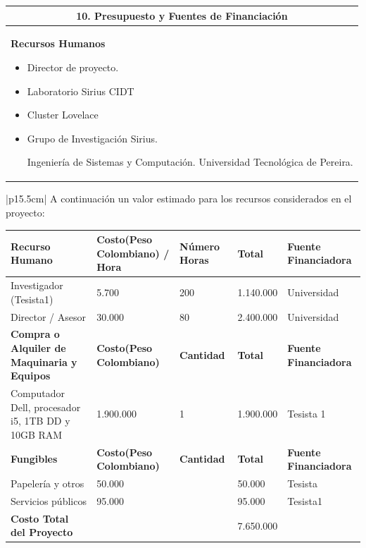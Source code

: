 \documentclass[letter,12pt]{article}
\begin{document}
\begin{center}
\begin{tabular}{|p{15.5cm}|}
\hline
\multicolumn{1}{|c|}{ \textbf{10. Presupuesto y Fuentes de Financiación}}\\
\hline

\textbf{Recursos Humanos}
\begin{itemize}
    \item Director de proyecto.
    \item Laboratorio Sirius CIDT
    \item Cluster Lovelace
    \item Grupo de Investigación Sirius. \par
    Ingeniería de Sistemas y Computación. Universidad Tecnológica de Pereira.
\end{itemize}\\
\hline
\end{tabular}
\end{center}
\begin{center}
\begin{tabular}{|p{15.5cm}|}
\hline
	A continuación un valor estimado para los recursos considerados en el proyecto:
	\begin{center}
    \begin{tabular}{|p{2.5cm}|p{3cm}|p{2cm}|p{2cm}|p{3cm}|}
    \hline
    \textbf{Recurso Humano} & \textbf{Costo(Peso Colombiano) / Hora } & \textbf{Número Horas} & \textbf{Total} & \textbf{Fuente Financiadora} \\
    \hline
    Investigador (Tesista1) & 5.700 & 200 & 1.140.000 & Universidad \\
    \hline    \hline
    Director / Asesor & 30.000 & 80 & 2.400.000 & Universidad \\
    \hline
    \textbf{Compra o Alquiler de Maquinaria y Equipos} & \textbf{Costo(Peso Colombiano) } & \textbf{Cantidad} & \textbf{Total} & \textbf{Fuente Financiadora} \\
    \hline
    Computador Dell, procesador i5, 1TB DD y 10GB RAM & 1.900.000 & 1 & 1.900.000 & Tesista 1 \\
    \hline

    \textbf{Fungibles} & \textbf{Costo(Peso Colombiano) } & \textbf{Cantidad} & \textbf{Total} & \textbf{Fuente Financiadora} \\
    \hline
    Papelería y otros & 50.000 &  & 50.000 & Tesista \\
    \hline
    Servicios públicos & 95.000 &  & 95.000 & Tesista1 \\
    \hline
    \textbf{Costo Total del Proyecto} &  &  & 7.650.000 &  \\
    \hline
    \end{tabular}
    \end{center}\\
\hline
\end{tabular}
\end{center}
\end{document}
